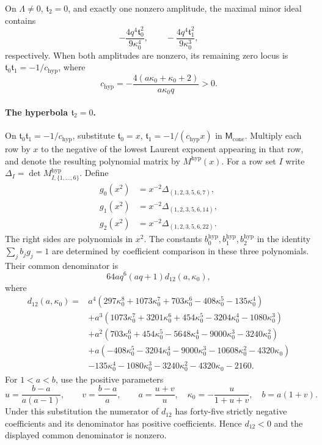 \documentclass[11pt,a4paper]{article}
\numberwithin{equation}{section}
\theoremstyle{plain}
\theoremstyle{definition}
\theoremstyle{remark}
\begin{document}
On $\Lambda\ne0$, $\mathfrak t_2=0$, and exactly one nonzero
amplitude, the maximal minor ideal contains
\[
 -\frac{4q^4\mathfrak t_0^2}{9\kappa_0^4},\qquad
 -\frac{4q^4\mathfrak t_1^2}{9\kappa_0^3},
\]
respectively. When both amplitudes are nonzero, its remaining zero
locus is $\mathfrak t_0\mathfrak t_1=-1/c_{\mathrm{hyp}}$, where
\[
 c_{\mathrm{hyp}}=-\frac{4(a\kappa_0+\kappa_0+2)}{a\kappa_0q}>0.
\]

\paragraph{The hyperbola $\mathfrak t_2=0$.}
On $\mathfrak t_0\mathfrak t_1=-1/c_{\mathrm{hyp}}$, substitute
$\mathfrak t_0=x$, $\mathfrak t_1=-1/(c_{\mathrm{hyp}}x)$ in $\mathsf M_{\mathrm{cone}}$. Multiply
each row by $x$ to the negative of the lowest Laurent exponent
appearing in that row, and denote the resulting polynomial matrix
by $M^{\mathrm{hyp}}(x)$. For a row set $I$ write
$\Delta_I=\det M^{\mathrm{hyp}}_{I,\{1,\ldots,6\}}$. Define
\[
 \begin{aligned}
 g_0(x^2)&=x^{-2}\Delta_{(1,2,3,5,6,7)},\\
 g_1(x^2)&=x^{-2}\Delta_{(1,2,3,5,6,14)},\\
 g_2(x^2)&=x^{-2}\Delta_{(1,2,3,5,6,22)}.
 \end{aligned}
\]
The right sides are polynomials in $x^2$. The constants $b_0^{\mathrm{hyp}},b_1^{\mathrm{hyp}},b_2^{\mathrm{hyp}}$
in the identity $\sum_jb_jg_j=1$ are determined by coefficient
comparison in these three polynomials. Their common denominator is
\[
 64a q^6(aq+1)d_{12}(a,\kappa_0),
\]
where
\[
\begin{aligned}
 d_{12}(a,\kappa_0)={}&a^4(297\kappa_0^8+1073\kappa_0^7+703\kappa_0^6-408\kappa_0^5-135\kappa_0^4)\\
 &+a^3(1073\kappa_0^7+3201\kappa_0^6+454\kappa_0^5-3204\kappa_0^4-1080\kappa_0^3)\\
 &+a^2(703\kappa_0^6+454\kappa_0^5-5648\kappa_0^4-9000\kappa_0^3-3240\kappa_0^2)\\
 &+a(-408\kappa_0^5-3204\kappa_0^4-9000\kappa_0^3-10608\kappa_0^2-4320\kappa_0)\\
 &-135\kappa_0^4-1080\kappa_0^3-3240\kappa_0^2-4320\kappa_0-2160.
\end{aligned}
\]
For $1<a<b$, use the positive parameters
\[
 u=\frac{b-a}{a(a-1)},\qquad v=\frac{b-a}{a},\qquad
 a=\frac{u+v}{u},\quad
 \kappa_0=-\frac{u}{1+u+v},\quad b=a(1+v).
\]
Under this substitution the numerator of $d_{12}$ has forty-five
strictly negative coefficients and its denominator has positive
coefficients. Hence $d_{12}<0$ and the displayed common denominator
is nonzero.
\end{document}
